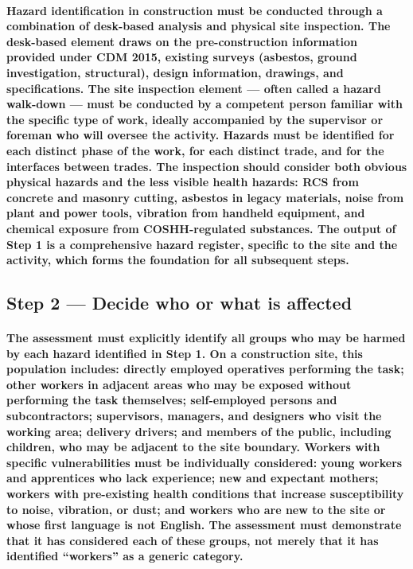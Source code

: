 \paragraph{Hazard identification in construction must be conducted through a combination of desk-based analysis and physical site inspection. The desk-based element draws on the pre-construction information provided under CDM 2015, existing surveys (asbestos, ground investigation, structural), design information, drawings, and specifications. The site inspection element --- often called a hazard walk-down --- must be conducted by a competent person familiar with the specific type of work, ideally accompanied by the supervisor or foreman who will oversee the activity. Hazards must be identified for each distinct phase of the work, for each distinct trade, and for the interfaces between trades. The inspection should consider both obvious physical hazards and the less visible health hazards: RCS from concrete and masonry cutting, asbestos in legacy materials, noise from plant and power tools, vibration from handheld equipment, and chemical exposure from COSHH-regulated substances. The output of Step 1 is a comprehensive hazard register, specific to the site and the activity, which forms the foundation for all subsequent steps.}

\subsection{Step 2 --- Decide who or what is affected}
\paragraph{The assessment must explicitly identify all groups who may be harmed by each hazard identified in Step 1. On a construction site, this population includes: directly employed operatives performing the task; other workers in adjacent areas who may be exposed without performing the task themselves; self-employed persons and subcontractors; supervisors, managers, and designers who visit the working area; delivery drivers; and members of the public, including children, who may be adjacent to the site boundary. Workers with specific vulnerabilities must be individually considered: young workers and apprentices who lack experience; new and expectant mothers; workers with pre-existing health conditions that increase susceptibility to noise, vibration, or dust; and workers who are new to the site or whose first language is not English. The assessment must demonstrate that it has considered each of these groups, not merely that it has identified ``workers'' as a generic category.}


